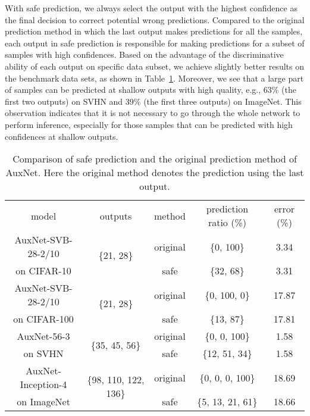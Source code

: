 \documentclass[10pt,onecolumn,letterpaper]{article}
\def\SexyName{AuxNet\xspace}
\begin{document}
With safe prediction, we always select the output with the highest confidence as the final decision to correct potential wrong predictions.
Compared to the original prediction method in which the last output makes predictions for all the samples,
each output in safe prediction is responsible for making predictions for a subset of samples with high confidences.
Based on the advantage of the discriminative ability of each output on specific data subset, we achieve slightly better results on the benchmark data sets, as shown in Table~\ref{tab:ensemble}.
Moreover, we see that a large part of samples can be predicted at shallow outputs with high quality, e.g., 63\% (the first two outputs) on SVHN and 39\% (the first three outputs) on ImageNet.
This observation indicates that it is not necessary to go through the whole network to perform inference, especially for those samples that can be predicted with high confidences at shallow outputs.


\begin{table}[htbp]
  \centering
  \caption{Comparison of safe prediction and the original prediction method of \SexyName. Here the original method denotes the prediction using the last output.}
    \begin{tabular}{c|c|c|c|c}
    \hline
    \multirow{2}[0]{*}{model} & \multirow{2}[0]{*}{outputs} & \multicolumn{1}{c|}{\multirow{2}[0]{*}{method}} & \multicolumn{1}{c|}{\multirow{2}[0]{*}{prediction ratio (\%)}} & \multicolumn{1}{c}{\multirow{2}[0]{*}{error (\%)}} \\
          &       &       &       &  \\
    \hline
    \SexyName-SVB-28-2/10 & \multirow{2}[0]{*}{\{21, 28\}} & original & \{0, 100\}     & 3.34 \\
    on CIFAR-10      &       & safe & \{32, 68\}     & 3.31 \\
    \hline
    \SexyName-SVB-28-2/10 & \multirow{2}[0]{*}{\{21, 28\}} & original & \{0, 100, 0\}     & 17.87 \\
    on CIFAR-100      &       & safe & \{13, 87\}     & 17.81 \\
    \hline
    \SexyName-56-3 & \multirow{2}[0]{*}{\{35, 45, 56\}} & original & \{0, 0, 100\}     & 1.58 \\
    on SVHN      &       & safe & \{12, 51, 34\}     & 1.58 \\
    \hline
    \SexyName-Inception-4 & \multirow{2}[0]{*}{\{98, 110, 122, 136\}} & original & \{0, 0, 0, 100\}     & 18.69 \\
    on ImageNet      &       & safe & \{5, 13, 21, 61\}     & 18.66 \\
    \hline
    \end{tabular}%
  \label{tab:ensemble}%
\end{table}%
\end{document}
